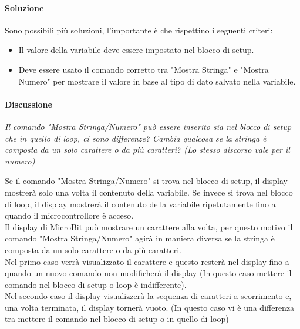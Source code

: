 \documentclass[../../docenti.tex]{subfiles}
\begin{document}
\paragraph{Soluzione}
Sono possibili più soluzioni, l'importante è che rispettino i seguenti criteri:
\begin{itemize}
	\item Il valore della variabile deve essere impostato nel blocco di setup.
	\item Deve essere usato il comando corretto tra "Mostra Stringa" e "Mostra Numero" per mostrare il valore in base al tipo di dato salvato nella variabile.
\end{itemize}

\paragraph{Discussione} \textit{Il comando "Mostra Stringa/Numero" può essere inserito sia nel blocco di setup che in quello di loop, ci sono differenze? Cambia qualcosa se la stringa è composta da un solo carattere o da più caratteri? (Lo stesso discorso vale per il numero)}


Se il comando "Mostra Stringa/Numero" si trova nel blocco di setup, il display mostrerà solo una volta il contenuto della variabile. Se invece si trova nel blocco di loop, il display mostrerà il contenuto della variabile ripetutamente fino a quando il microcontrollore è acceso.\\
Il display di MicroBit può mostrare un carattere alla volta, per questo motivo il comando "Mostra Stringa/Numero" agirà in maniera diversa se la stringa è composta da un solo carattere o da più caratteri.\\
Nel primo caso verrà visualizzato il carattere e questo resterà nel display fino a quando un nuovo comando non modificherà il display (In questo caso mettere il comando nel blocco di setup o loop è indifferente).\\
Nel secondo caso il display visualizzerà la sequenza di caratteri a  scorrimento e, una volta terminata, il display tornerà vuoto. (In questo caso vi è una differenza tra mettere il comando nel blocco di setup o in quello di loop)
\end{document}
